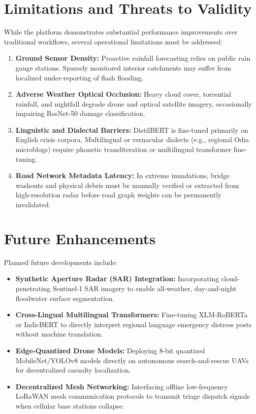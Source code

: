 \documentclass{article}
\begin{document}
\section{Limitations and Threats to Validity}
While the platform demonstrates substantial performance improvements over traditional workflows, several operational limitations must be addressed:
\begin{enumerate}[label=\textbf{\arabic*.}]
    \item \textbf{Ground Sensor Density:} Proactive rainfall forecasting relies on public rain gauge stations. Sparsely monitored interior catchments may suffer from localized under-reporting of flash flooding.
    \item \textbf{Adverse Weather Optical Occlusion:} Heavy cloud cover, torrential rainfall, and nightfall degrade drone and optical satellite imagery, occasionally impairing ResNet-50 damage classification.
    \item \textbf{Linguistic and Dialectal Barriers:} DistilBERT is fine-tuned primarily on English crisis corpora. Multilingual or vernacular dialects (e.g., regional Odia microblogs) require phonetic transliteration or multilingual transformer fine-tuning.
    \item \textbf{Road Network Metadata Latency:} In extreme inundations, bridge washouts and physical debris must be manually verified or extracted from high-resolution radar before road graph weights can be permanently invalidated.
\end{enumerate}

\section{Future Enhancements}
Planned future developments include:
\begin{itemize}
    \item \textbf{Synthetic Aperture Radar (SAR) Integration:} Incorporating cloud-penetrating Sentinel-1 SAR imagery to enable all-weather, day-and-night floodwater surface segmentation.
    \item \textbf{Cross-Lingual Multilingual Transformers:} Fine-tuning XLM-RoBERTa or IndicBERT to directly interpret regional language emergency distress posts without machine translation.
    \item \textbf{Edge-Quantized Drone Models:} Deploying 8-bit quantized MobileNet/YOLOv8 models directly on autonomous search-and-rescue UAVs for decentralized casualty localization.
    \item \textbf{Decentralized Mesh Networking:} Interfacing offline low-frequency LoRaWAN mesh communication protocols to transmit triage dispatch signals when cellular base stations collapse.
\end{itemize}
\end{document}
